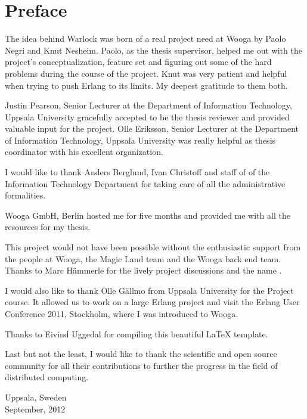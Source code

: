 \chapter{Preface}

The idea behind Warlock was born of a real project need at Wooga by Paolo Negri
and Knut Nesheim. Paolo, as the thesis supervisor, helped me out with the
project's conceptualization, feature set and figuring out some of the hard 
problems during the course of the project. Knut was very patient and helpful
when trying to push Erlang to its limits. My deepest gratitude to them both.

Justin Pearson, Senior Lecturer at the Department of Information Technology,
Uppsala University gracefully accepted to be the thesis reviewer and provided
valuable input for the project. Olle Eriksson, Senior Lecturer at the Department
of Information Technology, Uppsala University was really helpful as thesis
coordinator with his excellent organization.

I would like to thank Anders Berglund, Ivan Christoff and staff of 
of the Information Technology Department for taking care of all the
administrative formalities.

Wooga GmbH, Berlin hosted me for five months and provided me with all the
resources for my thesis.

This project would not have been possible without the enthusiastic support from 
the people at Wooga, the Magic Land team and the Wooga back end team. Thanks to
Marc Hämmerle for the lively project discussions and the name .

I would also like to thank Olle Gällmo from Uppsala University for the
Project  course. It allowed us to work on a large Erlang project and
visit the Erlang User Conference 2011, Stockholm, where I was
introduced to Wooga.

Thanks to Eivind Uggedal for compiling this beautiful {\LaTeX} template.

Last but not the least, I would like to thank the scientific and open
source community for all their contributions to further the progress in the
field of distributed computing.\\


\raggedright{Uppsala, Sweden \\
September, 2012}

